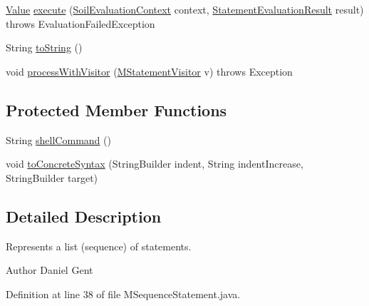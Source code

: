 \begin{DoxyCompactItemize}
\item 
\hyperlink{classorg_1_1tzi_1_1use_1_1uml_1_1ocl_1_1value_1_1_value}{Value} \hyperlink{classorg_1_1tzi_1_1use_1_1uml_1_1sys_1_1soil_1_1_m_sequence_statement_af4002e8023f6ce730f6fdab1d7dbde84}{execute} (\hyperlink{classorg_1_1tzi_1_1use_1_1uml_1_1sys_1_1soil_1_1_soil_evaluation_context}{Soil\-Evaluation\-Context} context, \hyperlink{classorg_1_1tzi_1_1use_1_1uml_1_1sys_1_1_statement_evaluation_result}{Statement\-Evaluation\-Result} result)  throws Evaluation\-Failed\-Exception 
\item 
String \hyperlink{classorg_1_1tzi_1_1use_1_1uml_1_1sys_1_1soil_1_1_m_sequence_statement_ac8e8122826e1959eda75ff92b153e967}{to\-String} ()
\item 
void \hyperlink{classorg_1_1tzi_1_1use_1_1uml_1_1sys_1_1soil_1_1_m_sequence_statement_a6a93c3f2d277e75d7baead56288fd9b7}{process\-With\-Visitor} (\hyperlink{interfaceorg_1_1tzi_1_1use_1_1uml_1_1sys_1_1soil_1_1_m_statement_visitor}{M\-Statement\-Visitor} v)  throws Exception 
\end{DoxyCompactItemize}
\subsection*{Protected Member Functions}
\begin{DoxyCompactItemize}
\item 
String \hyperlink{classorg_1_1tzi_1_1use_1_1uml_1_1sys_1_1soil_1_1_m_sequence_statement_ab629a4db4dd6de5099856083ad9b2a7f}{shell\-Command} ()
\item 
void \hyperlink{classorg_1_1tzi_1_1use_1_1uml_1_1sys_1_1soil_1_1_m_sequence_statement_af0e1e979360ec2636a3523e1b0e715a4}{to\-Concrete\-Syntax} (String\-Builder indent, String indent\-Increase, String\-Builder target)
\end{DoxyCompactItemize}


\subsection{Detailed Description}
Represents a list (sequence) of statements. \begin{DoxyAuthor}{Author}
Daniel Gent 
\end{DoxyAuthor}


Definition at line 38 of file M\-Sequence\-Statement.\-java.




